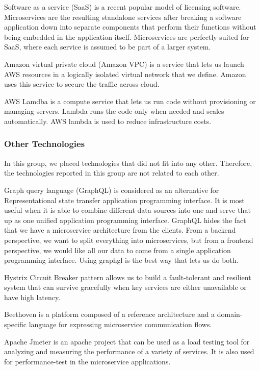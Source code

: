 Software as a service (SaaS) is a recent popular model of licensing software. Microservices are the resulting standalone services after breaking a software application down into separate components that perform their functions without being embedded in the application itself. Microservices are perfectly suited for SaaS, where each service is assumed to be part of a larger system.\cite{haugeland2020}

Amazon virtual private cloud (Amazon VPC) is a service that lets us launch AWS resources in a logically isolated virtual network that we define. Amazon\cite{Amazon} uses this service to secure the traffic across cloud.

AWS Lamdba is a compute service that lets us run code without provisioning or managing servers. Lambda runs the code only when needed and scales automatically. AWS lambda is used to reduce infrastructure costs.\cite{villamizar2017}

\subsubsection{Other Technologies}

In this group, we placed technologies that did not fit into any other. Therefore, the technologies reported in this group are not related to each other. 

Graph query language (GraphQL) is considered as an alternative for Representational state transfer application programming interface. It is most useful when it is able to combine different data sources into one and serve that up as one unified application programming interface. GraphQL hides the fact that we have a microservice architecture from the clients. From a backend perspective, we want to split everything into microservices, but from a frontend perspective, we would like all our data to come from a single application programming interface. Using graphgl is the best way that lets us do both.\cite{wang2020, overeem2018, Ghebremicael2017, gozneli2020}

Hystrix Circuit Breaker pattern allows us to build a fault-tolerant and resilient system that can survive gracefully when key services are either unavailable or have high latency.\cite{Kalske2017paper, Rodrigue2016, Uber} 

Beethoven is a platform composed of a reference architecture and a domain-specific language for expressing microservice communication flows.\cite{Monteiro2020}

Apache Jmeter is an apache project that can be used as a load testing tool for analyzing and measuring the performance of a variety of services. It is also used for performance-test in the microservice applications.\cite{Johansson2019, Hou2019}

